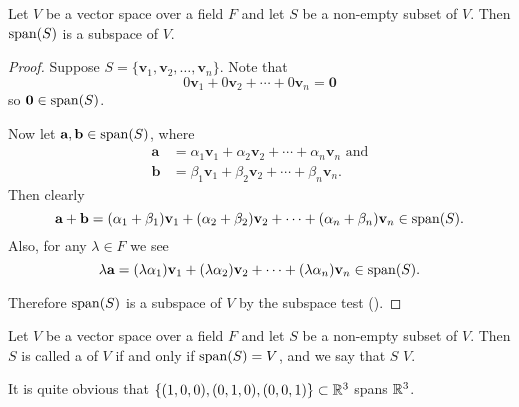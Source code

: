 \begin{proposition}
    Let $V$ be a vector space over a field $F$ and let $S$ be a non-empty subset of $V$. Then $\mathrm{span}(S)$ is a subspace of $V$.
\end{proposition}
\begin{proof}
    Suppose $S = \{\textbf{v}_1, \textbf{v}_2, \dots, \textbf{v}_n\}$. Note that
    \[
        0\textbf{v}_1 + 0\textbf{v}_2 + \cdots + 0\textbf{v}_n = \textbf{0}
    \]
    so $\textbf{0} \in \mathrm{span}(S)$.

    Now let $\textbf{a}, \textbf{b} \in \mathrm{span}(S)$, where
    \begin{align*}
        \textbf{a} &= \alpha_1\textbf{v}_1 + \alpha_2\textbf{v}_2 + \cdots + \alpha_n\textbf{v}_n \text{ and}\\
        \textbf{b} &= \beta_1\textbf{v}_1 + \beta_2\textbf{v}_2 + \cdots + \beta_n\textbf{v}_n.
    \end{align*}
    Then clearly
    \[
        \textbf{a} + \textbf{b} = (\alpha_1+\beta_1)\textbf{v}_1 + (\alpha_2+\beta_2)\textbf{v}_2 + \cdots + (\alpha_n+\beta_n)\textbf{v}_n \in \mathrm{span}(S).
    \]
    Also, for any $\lambda \in F$ we see
    \[
        \lambda\textbf{a} = (\lambda\alpha_1)\textbf{v}_1 + (\lambda\alpha_2)\textbf{v}_2 + \cdots + (\lambda\alpha_n)\textbf{v}_n \in \mathrm{span}(S).
    \]

    Therefore $\mathrm{span}(S)$ is a subspace of $V$ by the subspace test ().
\end{proof}

\begin{definition}
    Let $V$ be a vector space over a field $F$ and let $S$ be a non-empty subset of $V$. Then $S$ is called a  of $V$ if and only if $\mathrm{span}(S) = V$, and we say that $S$  $V$.
\end{definition}

\begin{example}
    It is quite obvious that $\{(1, 0, 0), (0, 1, 0), (0, 0, 1)\} \subset \mathbb{R}^3$ spans $\mathbb{R}^3$.
\end{example}

